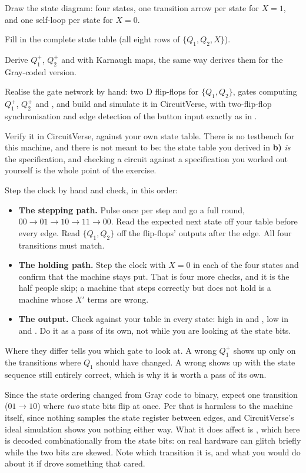  Draw the state diagram: four states, one transition arrow per state for $X = 1$, and one
self-loop per state for $X = 0$.

 Fill in the complete state table (all eight rows of $\{Q_1, Q_2, X\}$).

 Derive $Q_1^{+}$, $Q_2^{+}$ and  with Karnaugh maps, the same way
 derives them for the Gray-coded version.

 Realise the gate network by hand: two D flip-flops for $\{Q_1, Q_2\}$, gates computing
$Q_1^{+}$, $Q_2^{+}$ and , and build and simulate it in CircuitVerse, with two-flip-flop
synchronisation and edge detection of the button input exactly as in .

 Verify it in CircuitVerse, against your own state table. There is no testbench for this
machine, and there is not meant to be: the state table you derived in \textbf{b)} \emph{is} the
specification, and checking a circuit against a specification you worked out yourself is the whole
point of the exercise.

Step the clock by hand and check, in this order:
\begin{itemize}
  \item \textbf{The stepping path.} Pulse  once per step and go a full round,
    $00 \to 01 \to 10 \to 11 \to 00$. Read the expected next state off your table before every edge.
    Read $\{Q_1, Q_2\}$ off the flip-flops' outputs after the edge. All four transitions must match.
  \item \textbf{The holding path.} Step the clock with $X = 0$ in each of the four states and
    confirm that the machine stays put. That is four more checks, and it is the half people skip; a
    machine that steps correctly but does not hold is a machine whose $X'$ terms are wrong.
  \item \textbf{The output.} Check  against your table in every state: high in  and
    , low in  and . Do it as a pass of its own, not while you are looking
    at the state bits.
\end{itemize}

Where they differ tells you which gate to look at. A wrong $Q_1^{+}$ shows up only on the
transitions where $Q_1$ should have changed. A wrong  shows up with the state sequence still
entirely correct, which is why it is worth a pass of its own.

\note[Hint]Since the state ordering changed from Gray code to binary, expect one transition
($01 \to 10$) where \emph{two} state bits flip at once. Per  that is harmless
to the machine itself, since nothing samples the state register between edges, and CircuitVerse's
ideal simulation shows you nothing either way. What it does affect is , which here is decoded
combinationally from the state bits: on real hardware  can glitch briefly while the two bits
are skewed. Note which transition it is, and what you would do about it if  drove something
that cared.

